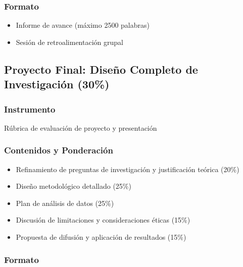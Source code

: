 \documentclass[11pt,letter,]{article}
\providecommand{\tightlist}{%
  \setlength{\itemsep}{0pt}\setlength{\parskip}{0pt}}
\begin{document}
\hypertarget{formato-1}{%
\subsubsection{Formato}\label{formato-1}}

\begin{itemize}
\tightlist
\item
  Informe de avance (máximo 2500 palabras)
\item
  Sesión de retroalimentación grupal
\end{itemize}

\hypertarget{proyecto-final-diseuxf1o-completo-de-investigaciuxf3n-30}{%
\subsection{Proyecto Final: Diseño Completo de Investigación
(30\%)}\label{proyecto-final-diseuxf1o-completo-de-investigaciuxf3n-30}}

\hypertarget{instrumento-2}{%
\subsubsection{Instrumento}\label{instrumento-2}}

Rúbrica de evaluación de proyecto y presentación

\hypertarget{contenidos-y-ponderaciuxf3n-2}{%
\subsubsection{Contenidos y
Ponderación}\label{contenidos-y-ponderaciuxf3n-2}}

\begin{itemize}
\tightlist
\item
  Refinamiento de preguntas de investigación y justificación teórica
  (20\%)
\item
  Diseño metodológico detallado (25\%)
\item
  Plan de análisis de datos (25\%)
\item
  Discusión de limitaciones y consideraciones éticas (15\%)
\item
  Propuesta de difusión y aplicación de resultados (15\%)
\end{itemize}

\hypertarget{formato-2}{%
\subsubsection{Formato}\label{formato-2}}
\end{document}
